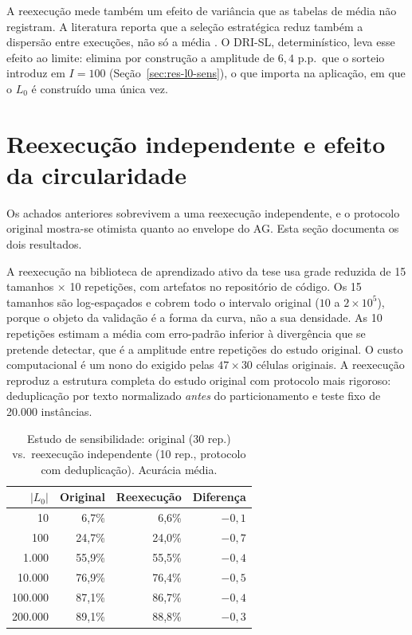 A reexecução mede também um efeito de variância que as tabelas de média não
registram. A
literatura reporta que a seleção estratégica reduz também a dispersão entre
execuções, não só a média \citep{Griesshaber2020, Yu2023Patron}. O DRI-SL,
determinístico, leva esse efeito ao limite: elimina por construção a
amplitude de $6{,}4$ p.p.\ que o sorteio introduz em $I=100$
(Seção~\ref{sec:res-l0-sens}), o que importa na aplicação, em que o $L_0$ é
construído uma única vez.

\section{Reexecução independente e efeito da circularidade}
\label{sec:res-l0-replay}

Os achados anteriores sobrevivem a uma reexecução independente, e o protocolo
original mostra-se otimista quanto ao envelope do AG. Esta seção documenta os
dois resultados.

A reexecução na biblioteca de aprendizado ativo da tese
\citep{DaruActiveLearning} usa grade reduzida de
15 tamanhos $\times$ 10 repetições, com artefatos no repositório de código.
Os 15 tamanhos são log-espaçados e cobrem todo o intervalo original ($10$ a
$2 \times 10^5$), porque o objeto da validação é a forma da curva, não a sua
densidade. As 10 repetições estimam a média com erro-padrão inferior à
divergência que se pretende detectar, que é a amplitude entre repetições do
estudo original. O custo computacional é um nono do exigido pelas
$47 \times 30$ células originais. A reexecução reproduz a estrutura completa do
estudo original com protocolo mais rigoroso: deduplicação por texto
normalizado \emph{antes} do particionamento e teste fixo de 20.000 instâncias.

\begin{table}[htb]
\centering
\caption{Estudo de sensibilidade: original (30 rep.) vs.\ reexecução
independente (10 rep., protocolo com deduplicação). Acurácia média.}
\label{tab:replay-vs-original}
\small
\begin{tabular}{r rr r}
\toprule
\textbf{$|L_0|$} & \textbf{Original} & \textbf{Reexecução} & \textbf{Diferença} \\
\midrule
10      & 6,7\%  & 6,6\%  & $-0{,}1$ \\
100     & 24,7\% & 24,0\% & $-0{,}7$ \\
1.000   & 55,9\% & 55,5\% & $-0{,}4$ \\
10.000  & 76,9\% & 76,4\% & $-0{,}5$ \\
100.000 & 87,1\% & 86,7\% & $-0{,}4$ \\
200.000 & 89,1\% & 88,8\% & $-0{,}3$ \\
\bottomrule
\end{tabular}
\end{table}

